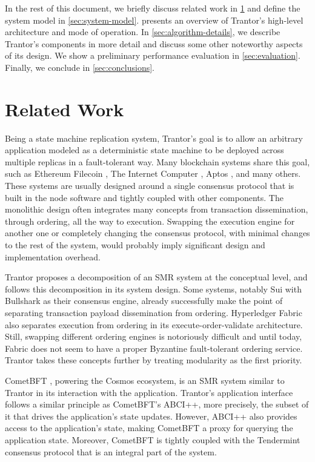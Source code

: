\documentclass{article}
\begin{document}
In the rest of this document,
we briefly discuss related work in \cref{sec:related-work} and define the system model in \cref{sec:system-model}.
 presents an overview of Trantor’s high-level architecture and mode of operation.
In \cref{sec:algorithm-details}, we describe Trantor’s components in more detail and discuss some other noteworthy aspects of its design.
We show a preliminary performance evaluation in \cref{sec:evaluation}.
Finally, we conclude in \cref{sec:conclusions}.

\section{Related Work}
\label{sec:related-work}

Being a state machine replication system,
Trantor’s goal is to allow an arbitrary application modeled as a deterministic state machine
to be deployed across multiple replicas in a fault-tolerant way.
Many blockchain systems share this goal, such as Ethereum \cite{ethereum} Filecoin \cite{filecoin}, The Internet Computer \cite{dfinity}, Aptos \cite{aptos}, and many others.
These systems are usually designed around a single consensus protocol that is built in the node software and tightly coupled with other components.
The monolithic design often integrates many concepts from transaction dissemination, through ordering, all the way to execution.
Swapping the execution engine for another one or completely changing the consensus protocol,
with minimal changes to the rest of the system, would probably imply significant design and implementation overhead.

Trantor proposes a decomposition of an SMR system at the conceptual level,
and follows this decomposition in its system design.
Some systems, notably Sui \cite{sui} with Bullshark \cite{bullshark} as their consensus engine,
already successfully make the point of separating transaction payload dissemination from ordering.
Hyperledger Fabric \cite{fabric} also separates execution from ordering in its execute-order-validate architecture.
Still, swapping different ordering engines is notoriously difficult and until today,
Fabric does not seem to have a proper Byzantine fault-tolerant ordering service.
Trantor takes these concepts further by treating modularity as the first priority.

CometBFT \cite{comet}, powering the Cosmos ecosystem, is an SMR system similar to Trantor in its interaction with the application.
Trantor's application interface follows a similar principle as CometBFT’s ABCI++,
more precisely, the subset of it that drives the application’s state updates.
However, ABCI++ also provides access to the application’s state, making CometBFT a proxy for querying the application state.
Moreover, CometBFT is tightly coupled with the Tendermint consensus protocol that is an integral part of the system.
\end{document}
